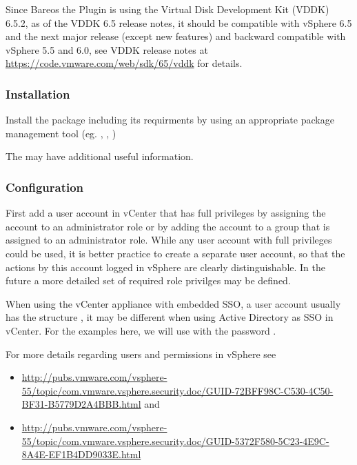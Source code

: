 Since Bareos  the Plugin is using
the Virtual Disk Development Kit (VDDK) 6.5.2, as of the VDDK 6.5 release notes, it
should be compatible with vSphere 6.5 and the next major release (except new features)
and backward compatible with vSphere 5.5 and 6.0, see VDDK release notes at
\url{https://code.vmware.com/web/sdk/65/vddk} for details.

\subsubsection{Installation}

Install the package  including its requirments
by using an appropriate package management tool
(eg. , , )

The  may have additional
useful information.

\subsubsection{Configuration}

First add a user account in vCenter that has full privileges by assigning
the account to an administrator role or by adding the account to a group
that is assigned to an administrator role. While any user account
with full privileges could be used, it is better practice to create a separate
user account, so that the actions by this account logged in vSphere are clearly
distinguishable. In the future a more detailed set of required role privilges
may be defined.

When using the vCenter appliance with embedded SSO, a user account usually has the
structure , it may be different when using
Active Directory as SSO in vCenter. For the examples here, we will use
 with the password .

For more details regarding users and permissions in vSphere see
\begin{itemize}
    \item \url{http://pubs.vmware.com/vsphere-55/topic/com.vmware.vsphere.security.doc/GUID-72BFF98C-C530-4C50-BF31-B5779D2A4BBB.html} and
    \item \url{http://pubs.vmware.com/vsphere-55/topic/com.vmware.vsphere.security.doc/GUID-5372F580-5C23-4E9C-8A4E-EF1B4DD9033E.html}
\end{itemize}

